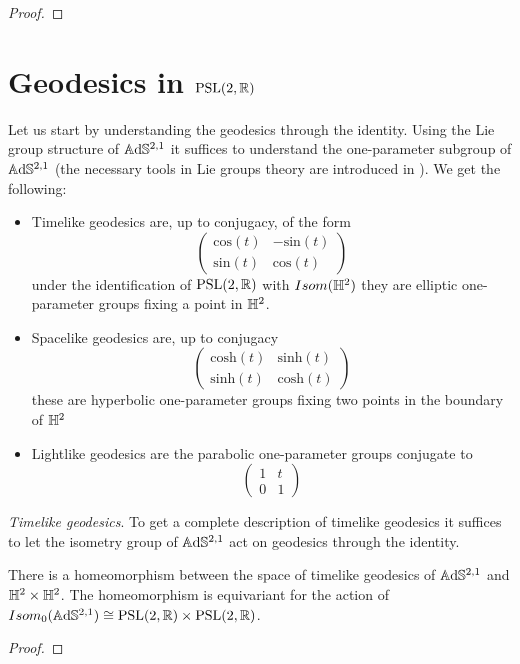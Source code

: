 \begin{proof}
\end{proof}


\section{Geodesics in $\text{PSL}(2,\mathbb{R})$}
Let us start by understanding the geodesics through the identity. Using the Lie group structure of $\mathbb{A}\mathrm{d}\mathbb{S}^{2,1}$ it suffices to understand the one-parameter subgroup of $\mathbb{A}\mathrm{d}\mathbb{S}^{2,1}$
(the necessary tools in Lie groups theory are introduced in \cite{bonsanteseppi}). We get the following:
\begin{itemize}
    \item Timelike geodesics are, up to conjugacy, of the form
    \[ \begin{pmatrix}
        \text{cos}(t) & -\text{sin}(t) \\
        \text{sin}(t) & \text{cos}(t)
    \end{pmatrix} \]
    under the identification of $\text{PSL}(2,\mathbb{R})$ with $Isom(\mathbb{H}^2)$ they are elliptic one-parameter groups fixing a point in $\mathbb{H}^2$.
    \item Spacelike geodesics are, up to conjugacy
    \[ \begin{pmatrix}
        \text{cosh}(t) & \text{sinh}(t) \\
        \text{sinh}(t) & \text{cosh}(t)
    \end{pmatrix} \]
    these are hyperbolic one-parameter groups fixing two points in the boundary of $\mathbb{H}^2$
    \item Lightlike geodesics are the parabolic one-parameter groups conjugate to
    \[ \begin{pmatrix}
        1 & t \\
        0 & 1
    \end{pmatrix} \]
\end{itemize}

\noindent\textit{Timelike geodesics}.
To get a complete description of timelike geodesics it suffices to let the isometry group of $\mathbb{A}\mathrm{d}\mathbb{S}^{2,1}$ act on geodesics through the identity.
\begin{proposition}
    There is a homeomorphism between the space of timelike geodesics of $\mathbb{A}\mathrm{d}\mathbb{S}^{2,1}$ and $\mathbb{H}^2 \times \mathbb{H}^2$.
    The homeomorphism is equivariant for the action of $Isom_0(\mathbb{A}\mathrm{d}\mathbb{S}^{2,1}) \cong \text{PSL}(2,\mathbb{R}) \times \text{PSL}(2,\mathbb{R})$.
\end{proposition}
\begin{proof}
\end{proof}

